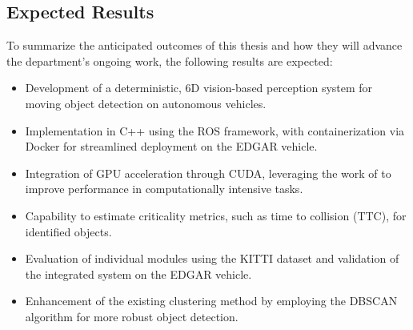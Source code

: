 \subsection{Expected Results}%

To summarize the anticipated outcomes of this thesis and how they will advance the department’s ongoing work, the following results are expected:

\begin{itemize} 
  \item Development of a deterministic, 6D vision-based perception system for moving object detection on autonomous vehicles. 
  \item Implementation in C++ using the ROS framework, with containerization via Docker for streamlined deployment on the EDGAR vehicle. 
  \item Integration of GPU acceleration through CUDA, leveraging the work of \cite{previous_tfm_pastor} to improve performance in computationally intensive tasks. 
  \item Capability to estimate criticality metrics, such as time to collision (TTC), for identified objects. 
  \item Evaluation of individual modules using the KITTI dataset and validation of the integrated system on the EDGAR vehicle. 
  \item Enhancement of the existing clustering method by employing the DBSCAN algorithm for more robust object detection. 
\end{itemize}